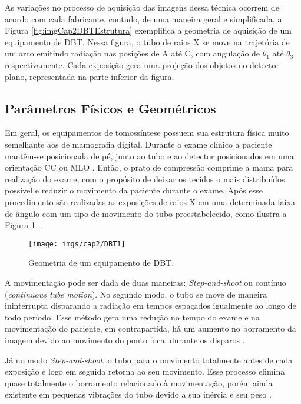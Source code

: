 As variações no processo de aquisição das imagens dessa técnica ocorrem de acordo com cada fabricante, contudo, de uma maneira geral e simplificada, a Figura \ref{fig:imgCap2DBTEstrutura} exemplifica a geometria de aquisição de um equipamento de \acs{DBT}. Nessa figura, o tubo de raios X se move na trajetória de um arco emitindo radiação nas posições de A até C, com angulação de $\theta_{1}$ até $\theta_{3}$ respectivamente. Cada exposição gera uma projeção dos objetos no detector plano, representada na parte inferior da figura.

\subsection{Parâmetros Físicos e Geométricos}\label{ParâmetrosFísicoseGeométricos}

Em geral, os equipamentos de tomossíntese possuem sua estrutura física muito semelhante aos de  mamografia digital. Durante o exame clínico a paciente mantêm-se posicionada de pé, junto ao tubo e ao detector posicionados em uma orientação \ac{CC} ou \ac{MLO} \cite{Niklason20185}. Então, o prato de compressão comprime a mama para realização do exame, com o propósito de deixar os tecidos o mais distribuídos possível e reduzir o movimento da paciente durante o exame. Após esse procedimento são realizadas as exposições de raios X em uma determinada faixa de ângulo com um tipo de movimento do tubo preestabelecido, como ilustra a Figura \ref{fig:imgCap2DBTEstrutura1} \cite{baker2011breast}.  

\begin{figure}[htb]
	\caption{Geometria de um equipamento de \acs{DBT}.}
	\begin{center}
		\texttt{[image: imgs/cap2/DBT1]}
	\end{center}
	\label{fig:imgCap2DBTEstrutura1}
\end{figure}

A movimentação pode ser dada de duas maneiras: \textit{Step-and-shoot} ou contínuo (\textit{continuous tube motion}). No segundo modo, o tubo se move de maneira ininterrupta disparando a radiação em tempos espaçados igualmente ao longo de todo período. Esse método gera uma redução no tempo do exame e na movimentação do paciente, em contrapartida, há um aumento no borramento da imagem devido ao movimento do ponto focal durante os disparos \cite{glick2014system}. 

Já no modo \textit{Step-and-shoot}, o tubo para o movimento totalmente antes de cada exposição e logo em seguida retorna ao seu movimento. Esse processo elimina quase totalmente o borramento relacionado à movimentação, porém ainda existente em pequenas vibrações do tubo devido a sua inércia e seu peso \cite{glick2014system}.

